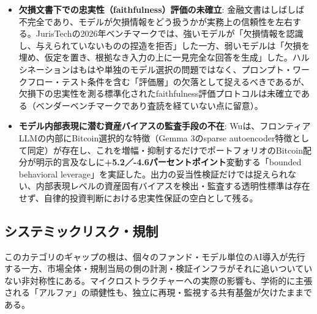 \begin{itemize}
  \item \textbf{欠損文書下での忠実性（faithfulness）評価の未確立}: 金融文書はしばしば不完全であり、モデルが欠損情報をどう扱うかが実務上の信頼性を左右する。JurisTechの2026年ベンチマーク\cite{x07juristech2026}では、強いモデルが「欠損情報を認識し、与えられていないものの捏造を拒否」した一方、弱いモデルは「欠損を埋め、仮定を置き、根拠なき入力の上に一見完全な回答を生成」した。ハルシネーションはもはや単独のモデル選択の問題ではなく、プロンプト・ワークフロー・テスト条件を含む「評価層」の欠落として捉えるべきであるが、欠損下の忠実性を測る標準化されたfaithfulness評価プロトコルは未確立である（ベンダーベンチマークであり査読を経ていない点に留意）。
  \item \textbf{モデル内部表現に潜む資産バイアスの監査手段の不在}: Wu\cite{x07assetbias2026}は、フロンティアLLMの内部にBitcoin選択的な特徴（Gemma 3のsparse autoencoder特徴として同定）が存在し、これを増幅・抑制するだけでポートフォリオのBitcoin配分が明示的言及なしに\textbf{+5.2／-4.6パーセントポイント}変動する「bounded behavioral leverage」を実証した。出力の妥当性検証だけでは捉えられない、内部表現レベルの資産固有バイアスを検出・監査する透明性標準は存在せず、自律的投資判断における忠実性保証の空白として残る。
\end{itemize}

\subsection{システミックリスク・規制}

このカテゴリのギャップの根は、個々のファンド・モデル単位のAI導入が先行する一方、市場全体・規制当局の側の計測・検証インフラがそれに追いついていない非対称性にある。マイクロストラクチャーへの実際の影響も、学術的に主張される「アルファ」の頑健性も、独立に再現・監視する共有基盤が欠けたままである。

